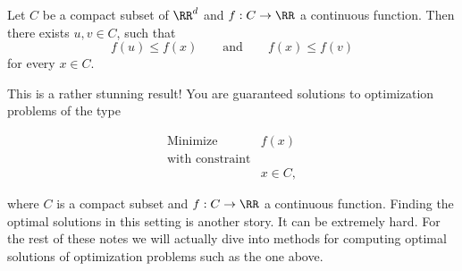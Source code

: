 \documentclass{article}
\begin{document}
\begin{theorem}[emph]\label{thmcontcomp}
  Let $C$ be a compact subset of $\RR^d$ and $f: C\rightarrow \RR$
  a continuous function. Then there exists $u, v\in C$, such that
  $$
  f(u) \leq f(x)\qquad\text{and}\qquad f(x)\leq f(v)
  $$
  for every $x\in C$.
\end{theorem}

This is a rather stunning result! You are guaranteed solutions to
optimization problems of the type

\begin{align*}
  &\text{Minimize} &f(x)&\\
  &\text{with constraint}\\
  &&x\in C,
\end{align*}

where $C$ is a compact subset and $f: C\rightarrow \RR$ a continuous function.
Finding the optimal solutions in this setting is another story. It can be
extremely hard. For the rest of these notes we will actually dive into
methods for computing optimal solutions of optimization problems such as
the one above.
\end{document}
